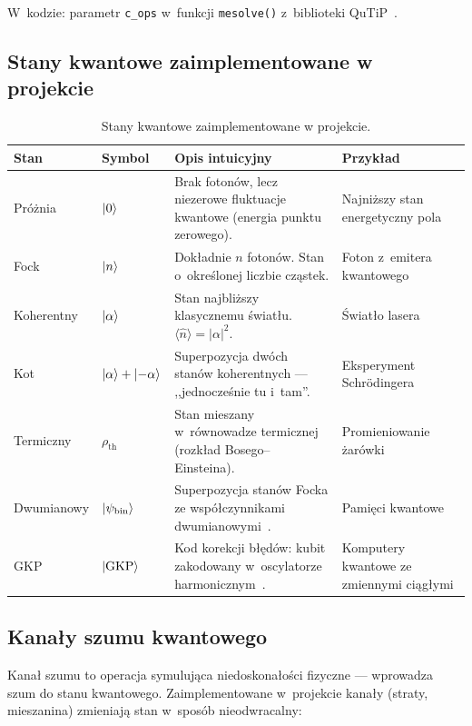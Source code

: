 \documentclass[12pt,a4paper]{article}
\begin{document}
\noindent W~kodzie: parametr \texttt{c\_ops} w~funkcji \texttt{mesolve()} z~biblioteki QuTiP~\cite{qutip}.

\subsection{Stany kwantowe zaimplementowane w projekcie}
\label{sec:stany-opis}

\begin{table}[htbp]
\centering
\caption{Stany kwantowe zaimplementowane w projekcie.}
\label{tab:stany}
\begin{tabular}{@{}llp{5.5cm}p{4cm}@{}}
\toprule
\textbf{Stan} & \textbf{Symbol} & \textbf{Opis intuicyjny} & \textbf{Przykład} \\
\midrule
Próżnia & $\ket{0}$ & Brak fotonów, lecz niezerowe fluktuacje kwantowe (energia punktu zerowego). & Najniższy stan energetyczny pola \\
\addlinespace
Fock & $\ket{n}$ & Dokładnie $n$ fotonów. Stan o~określonej liczbie cząstek. & Foton z~emitera kwantowego \\
\addlinespace
Koherentny & $\ket{\alpha}$ & Stan najbliższy klasycznemu światłu. $\langle\hat{n}\rangle = |\alpha|^2$. & Światło lasera \\
\addlinespace
Kot & $\ket{\alpha}+\ket{-\alpha}$ & Superpozycja dwóch stanów koherentnych --- ,,jednocześnie tu i~tam''. & Eksperyment Schrödingera \\
\addlinespace
Termiczny & $\rho_\mathrm{th}$ & Stan mieszany w~równowadze termicznej (rozkład Bosego--Einsteina). & Promieniowanie żarówki \\
\addlinespace
Dwumianowy & $\ket{\psi_\mathrm{bin}}$ & Superpozycja stanów Focka ze współczynnikami dwumianowymi~\cite{michael2016}. & Pamięci kwantowe \\
\addlinespace
GKP & $\ket{\mathrm{GKP}}$ & Kod korekcji błędów: kubit zakodowany w~oscylatorze harmonicznym~\cite{gottesman2001}. & Komputery kwantowe ze zmiennymi ciągłymi \\
\bottomrule
\end{tabular}
\end{table}

\subsection{Kanały szumu kwantowego}

Kanał szumu to operacja symulująca niedoskonałości fizyczne --- wprowadza szum do stanu kwantowego. Zaimplementowane w~projekcie kanały (straty, mieszanina) zmieniają stan w~sposób nieodwracalny:
\end{document}
